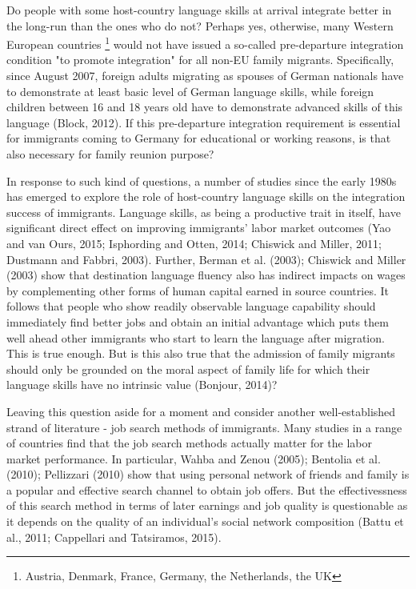 \documentclass[12pt,a4paper]{article}
\begin{document}
Do people with some host-country language skills at arrival integrate better in the long-run than the ones who do not? Perhaps yes, otherwise, many Western European countries \footnote{Austria, Denmark, France, Germany, the Netherlands, the UK} would not have issued a so-called pre-departure integration condition "to promote integration" for all non-EU family migrants. Specifically, since August 2007, foreign adults migrating as spouses of German nationals have to demonstrate at least basic level of German language skills, while foreign children between 16 and 18 years old have to demonstrate advanced skills of this language (Block, 2012). If this pre-departure integration requirement is essential for immigrants coming to Germany for educational or working reasons, is that also necessary for family reunion purpose? 

In response to such kind of questions, a number of studies since the early 1980s has emerged to explore the role of host-country language skills on the integration success of immigrants. Language skills, as being a productive trait in itself, have significant direct effect on improving immigrants' labor market outcomes (Yao and van Ours, 2015; Isphording and Otten, 2014; Chiswick and Miller, 2011; Dustmann and Fabbri, 2003). Further, Berman et al. (2003); Chiswick and Miller (2003) show that destination language fluency also has indirect impacts on wages by complementing other forms of human capital earned in source countries. It follows that people who show readily observable language capability should immediately find better jobs and obtain an initial advantage which puts them well ahead other immigrants who start to learn the language after migration. This is true enough. But is this also true that the admission of family migrants should only be grounded on the moral aspect of family life for which their language skills have no intrinsic value (Bonjour, 2014)?

Leaving this question aside for a moment and consider another well-established strand of literature - job search methods of immigrants. Many studies in a range of countries find that the job search methods actually matter for the labor market performance. In particular, Wahba and Zenou (2005); Bentolia et al. (2010); Pellizzari (2010) show that using personal network of friends and family is a popular and effective search channel to obtain job offers. But the effectivessness of this search method in terms of later earnings and job quality is questionable as it depends on the quality of an individual's social network composition (Battu et al., 2011; Cappellari and Tatsiramos, 2015). 
\end{document}
